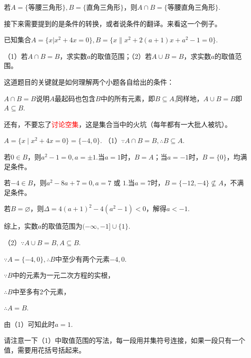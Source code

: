 \documentclass[lang=cn,math=cm,chinesefont=nofont,11pt,scheme=chinese,onecol]{elegantbook}
\begin{document}
\begin{example}
  若$A=\{\text{等腰三角形}\},B=\{\text{直角三角形}\}$，则$A\cap B=\{\text{等腰直角三角形}\}.$
\end{example}

\hspace*{\fill}

接下来需要提到的是条件的转换，或者说条件的翻译。来看这一个例子。
\begin{example}
  已知集合$A=\{x|x^{2}+4x=0\},B=\{x\|x^{2}+2(a+1)x+a^{2}-1=0\}.$

  （1）若$A\cap B=B$，求实数$a$的取值范围；（2）若$A\cup B=B$，求实数$a$的取值范围。
\end{example}
\begin{remark}
  这道题目的关键就是如何理解两个小题各自给出的条件：

  $A\cap B=B$说明$A$最起码也包含$B$中的所有元素，即$B\subseteq A$,同样地，$A\cup B=B$即$A\subseteq B$.

  还有，不要忘了\textcolor{red}{讨论空集}，这是集合当中的火坑（每年都有一大批人被坑）。
\end{remark}
\begin{solution}
  $A=\{x\mid x^{2}+4x=0\}=\{-4,0\}.$
  （1）$\because A\cap B=B,$\enspace$\therefore B\subseteq A.$
  
  若$0\in B$，则$a^2-1=0,a=\pm 1.$当$a=1$时，$B=A$；当$a=-1$时，$B=\{0\}$，均满足条件。

  若$-4\in B$，则$a^2-8a+7=0,a=7\text{ 或 }1.$当$a=7$时，$B=\{-12,-4\}\nsubseteq A$，不满足条件。

  若$B=\varnothing$，则$\Delta=4(a+1)^{2}-4(a^{2}-1)<0$，解得$a<-1$.

  综上，实数$a$的取值范围为$(-\infty,-1]\cup\{1\}.$

  （2）$\because A\cup B=B,$\enspace$A\subseteq B.$

  $\because A=\{-4,0\},$\enspace$\therefore B$中至少有两个元素$-4,0.$

  $\because B$中的元素为一元二次方程的实根，

  $\therefore B$中至多有2个元素，

  $\therefore A=B.$

  由（1）可知此时$a=1$.
\end{solution}
\begin{remark}
  请注意一下（1）中取值范围的写法，每一段用并集符号连接，如果一段只有一个值，需要用花括号括起来。
\end{remark}

\hspace*{\fill}
\end{document}
